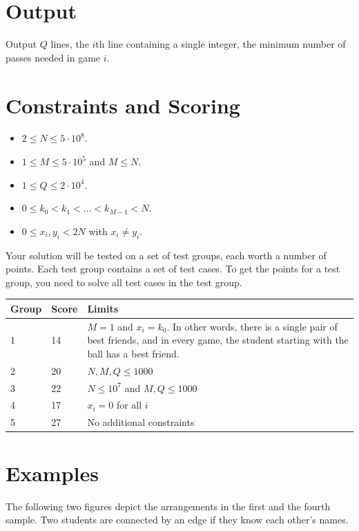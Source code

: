 \section*{Output}
Output $Q$ lines, the $i$th line containing a single integer, the minimum number of passes needed in game $i$.

\section*{Constraints and Scoring}
\begin{itemize}
\item $2 \leq N \leq 5 \cdot 10^8$.
\item $1 \leq M \leq 5 \cdot 10^5$ and $M \le N$.
\item $1 \leq Q \leq 2 \cdot 10^4$.
\item $0 \leq k_0 < k_1 < \ldots < k_{M - 1} < N$.
\item $0 \leq x_i, y_i < 2N$ with $x_i \neq y_i$.
\end{itemize}


Your solution will be tested on a set of test groups, each worth a number of points.
Each test group contains a set of test cases. To get the points for a test group, you need to
solve all test cases in the test group.

\begin{tabular}{|l|l|l|}
\hline
Group  &  Score  &  Limits \\
\hline
 1 & 14 & $M = 1$ and $x_i = k_0$. In other words, there is a single pair of best friends, and in every game, the student starting with the ball has a best friend. \\
\hline
 2 & 20 & $N,M,Q \leq 1000$ \\
\hline
 3 & 22 & $N \leq 10^7$ and $M,Q\leq 1000$ \\
\hline
 4 & 17 & $x_i = 0$ for all $i$ \\
\hline
 5 & 27 & No additional constraints \\
\hline
\end{tabular}
\section*{Examples}
The following two figures depict the arrangements in the first and the fourth sample.
Two students are connected by an edge if they know each other's names.

